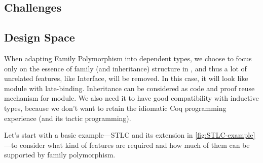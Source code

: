 \subsection{Challenges}

\subsection{Design Space}

When adapting Family Polymorphism into dependent types, we choose to
focus only on the essence of family (and inheritance)
structure in \citet{zm2017}, and thus a lot of unrelated features, like
Interface, will be removed. In this case, it will look like module with
late-binding. Inheritance can be considered as code and proof reuse mechanism for module. We also
need it to have good compatibility with inductive types, because we
don't want to retain the idiomatic Coq programming experience
(and its tactic programming). 

Let's start with a basic example---STLC and its extension in
\cref{fig:STLC-example}---to consider what kind of features are required
and how much of them can be supported by family polymorphism.

